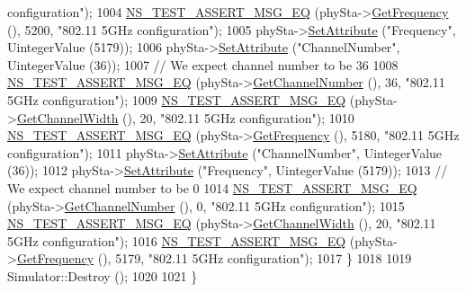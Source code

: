 \begin{DoxyCode}
{       configuration"});
1004     \hyperlink{group__testing_ga2a9d78cffb3db8e867c35fff0b698cf5}{NS\_TEST\_ASSERT\_MSG\_EQ} (phySta->\hyperlink{classns3_1_1WifiPhy_ad2508d94faf22d690d6b8b4367934fd1}{GetFrequency} (), 5200, \textcolor{stringliteral}{"802.11 5GHz
       configuration"});
1005     phySta->\hyperlink{classns3_1_1ObjectBase_ac60245d3ea4123bbc9b1d391f1f6592f}{SetAttribute} (\textcolor{stringliteral}{"Frequency"}, UintegerValue (5179));
1006     phySta->\hyperlink{classns3_1_1ObjectBase_ac60245d3ea4123bbc9b1d391f1f6592f}{SetAttribute} (\textcolor{stringliteral}{"ChannelNumber"}, UintegerValue (36));
1007     \textcolor{comment}{// We expect channel number to be 36}
1008     \hyperlink{group__testing_ga2a9d78cffb3db8e867c35fff0b698cf5}{NS\_TEST\_ASSERT\_MSG\_EQ} (phySta->\hyperlink{classns3_1_1WifiPhy_a5cf0ccf06109ace61db51c83e91b7e8d}{GetChannelNumber} (), 36, \textcolor{stringliteral}{"802.11
       5GHz configuration"});
1009     \hyperlink{group__testing_ga2a9d78cffb3db8e867c35fff0b698cf5}{NS\_TEST\_ASSERT\_MSG\_EQ} (phySta->\hyperlink{classns3_1_1WifiPhy_a4a5d5009b3b3308f2baeed42a2007189}{GetChannelWidth} (), 20, \textcolor{stringliteral}{"802.11 5GHz
       configuration"});
1010     \hyperlink{group__testing_ga2a9d78cffb3db8e867c35fff0b698cf5}{NS\_TEST\_ASSERT\_MSG\_EQ} (phySta->\hyperlink{classns3_1_1WifiPhy_ad2508d94faf22d690d6b8b4367934fd1}{GetFrequency} (), 5180, \textcolor{stringliteral}{"802.11 5GHz
       configuration"});
1011     phySta->\hyperlink{classns3_1_1ObjectBase_ac60245d3ea4123bbc9b1d391f1f6592f}{SetAttribute} (\textcolor{stringliteral}{"ChannelNumber"}, UintegerValue (36));
1012     phySta->\hyperlink{classns3_1_1ObjectBase_ac60245d3ea4123bbc9b1d391f1f6592f}{SetAttribute} (\textcolor{stringliteral}{"Frequency"}, UintegerValue (5179));
1013     \textcolor{comment}{// We expect channel number to be 0}
1014     \hyperlink{group__testing_ga2a9d78cffb3db8e867c35fff0b698cf5}{NS\_TEST\_ASSERT\_MSG\_EQ} (phySta->\hyperlink{classns3_1_1WifiPhy_a5cf0ccf06109ace61db51c83e91b7e8d}{GetChannelNumber} (), 0, \textcolor{stringliteral}{"802.11
       5GHz configuration"});
1015     \hyperlink{group__testing_ga2a9d78cffb3db8e867c35fff0b698cf5}{NS\_TEST\_ASSERT\_MSG\_EQ} (phySta->\hyperlink{classns3_1_1WifiPhy_a4a5d5009b3b3308f2baeed42a2007189}{GetChannelWidth} (), 20, \textcolor{stringliteral}{"802.11 5GHz
       configuration"});
1016     \hyperlink{group__testing_ga2a9d78cffb3db8e867c35fff0b698cf5}{NS\_TEST\_ASSERT\_MSG\_EQ} (phySta->\hyperlink{classns3_1_1WifiPhy_ad2508d94faf22d690d6b8b4367934fd1}{GetFrequency} (), 5179, \textcolor{stringliteral}{"802.11 5GHz
       configuration"});
1017   \}
1018 
1019   Simulator::Destroy ();
1020 
1021 \}
\end{DoxyCode}


